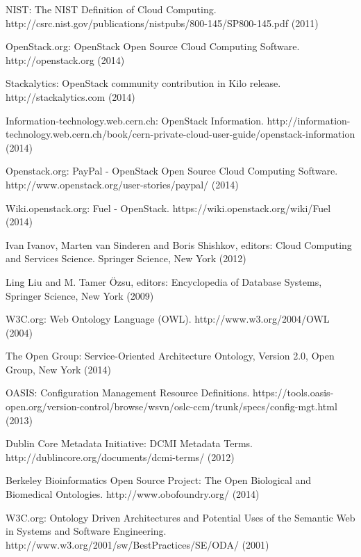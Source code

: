 


NIST: The NIST Definition of Cloud Computing. http://csrc.nist.gov/publications/nistpubs/800-145/SP800-145.pdf (2011)

OpenStack.org: OpenStack Open Source Cloud Computing Software. http://openstack.org (2014)

Stackalytics: OpenStack community contribution in Kilo release. http://stackalytics.com (2014)

Information-technology.web.cern.ch: OpenStack Information. http://information-technology.web.cern.ch/book/cern-private-cloud-user-guide/openstack-information (2014)

Openstack.org: PayPal - OpenStack Open Source Cloud Computing Software. http://www.openstack.org/user-stories/paypal/ (2014)

Wiki.openstack.org: Fuel - OpenStack. https://wiki.openstack.org/wiki/Fuel (2014)

Ivan Ivanov, Marten van Sinderen and Boris Shishkov, editors: Cloud Computing and Services Science. Springer Science, New York (2012)


Ling Liu and M. Tamer Özsu, editors: Encyclopedia of Database Systems, Springer Science, New York (2009)

W3C.org: Web Ontology Language (OWL). http://www.w3.org/2004/OWL (2004)

The Open Group: Service-Oriented Architecture Ontology, Version 2.0, Open Group, New York (2014)

OASIS: Configuration Management Resource Definitions. https://tools.oasis-open.org/version-control/browse/wsvn/oslc-ccm/trunk/specs/config-mgt.html (2013)

Dublin Core Metadata Initiative: DCMI Metadata Terms. http://dublincore.org/documents/dcmi-terms/ (2012)

Berkeley Bioinformatics Open Source Project: The Open Biological and Biomedical Ontologies.  http://www.obofoundry.org/ (2014)

W3C.org: Ontology Driven Architectures and Potential Uses of the Semantic Web in Systems and Software Engineering. http://www.w3.org/2001/sw/BestPractices/SE/ODA/ (2001)

